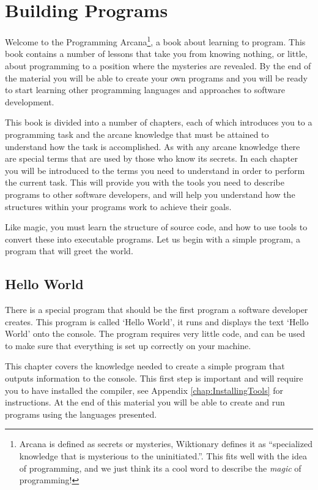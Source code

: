 \chapter{Building Programs} %
\label{cha:building programs}

Welcome to the Programming Arcana\footnote{Arcana is defined as secrets or mysteries, Wiktionary defines it as ``specialized knowledge that is mysterious to the uninitiated.''. This fits well with the idea of programming, and we just think its a cool word to describe the \emph{magic} of programming!}, a book about learning to program. This book contains a number of lessons that take you from knowing nothing, or little, about programming to a position where the mysteries are revealed. By the end of the material you will be able to create your own programs and you will be ready to start learning other programming languages and approaches to software development.

This book is divided into a number of chapters, each of which introduces you to a programming task and the arcane knowledge that must be attained to understand how the task is accomplished. As with any arcane knowledge there are special terms that are used by those who know its secrets. In each chapter you will be introduced to the terms you need to understand in order to perform the current task. This will provide you with the tools you need to describe programs to other software developers, and will help you understand how the structures within your programs work to achieve their goals.

Like magic, you must learn the structure of source code, and how to use tools to convert these into executable programs. Let us begin with a simple program, a program that will greet the world.

\minitoc

\clearpage

\section{Hello World} %
\label{sec:hello world}

There is a special program that should be the first program a software developer creates. This program is called `Hello World', it runs and displays the text `Hello World' onto the console. The program requires very little code, and can be used to make sure that everything is set up correctly on your machine.

This chapter covers the knowledge needed to create a simple program that outputs information to the console. This first step is important and will require you to have installed the compiler, see Appendix \ref{chap:InstallingTools} for instructions. At the end of this material you will be able to create and run programs using the languages presented.

